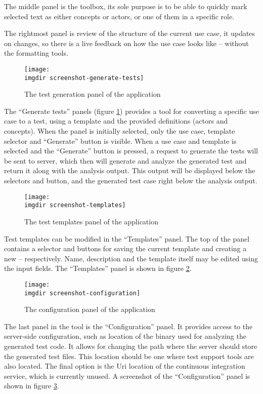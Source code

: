 \noindent The middle panel is the toolbox, its sole purpose is to be able to quickly mark selected text as either concepts or actors, or one of them in a specific role.\medskip

\noindent The rightmost panel is review of the structure of the current use case, it updates on changes, so there is a live feedback on how the use case looks like -- without the formatting tools.\medskip

\begin{figure}[!htbp]
  \centering
  \texttt{[image: \\imgdir screenshot-generate-tests]}
  \caption{The test generation panel of the application}
\label{fig:screenshot-screenshot-generate-tests}
\end{figure}

\noindent The ``Generate tests'' panels (figure \ref{fig:screenshot-screenshot-generate-tests}) provides a tool for converting a specific use case to a test, using a template and the provided definitions (actors and concepts). When the panel is initially selected, only the use case, template selector and ``Generate'' button is visible. When a use case and template is selected and the ``Generate''  button is pressed, a request to generate the tests will be sent to server, which then will generate and analyze the generated test and return it along with the analysis output. This output will be displayed below the selectors and button, and the generated test case right below the analysis output.\medskip

\begin{figure}[!htbp]
  \centering
  \texttt{[image: \\imgdir screenshot-templates]}
  \caption{The test templates panel of the application}
\label{fig:screenshot-templates}
\end{figure}

\noindent Test templates can be modified in the ``Templates'' panel. The top of the panel contains a selector and buttons for saving the current template and creating a new -- respectively. Name, description and the template itself may be edited using the input fields. The ``Templates'' panel is shown in figure \ref{fig:screenshot-templates}.\medskip

\begin{figure}[!htbp]
  \centering
  \texttt{[image: \\imgdir screenshot-configuration]}
  \caption{The configuration panel of the application}
\label{fig:screenshot-configuration}
\end{figure}

\noindent The last panel in the tool is the ``Configuration'' panel. It provides access to the server-side configuration, such as location of the binary used for analyzing the generated test code. It allows for changing the path where the server should store the generated test files. This location should be one where test support tools are also located. The final option is the Uri location of the continuous integration service, which is currently unused. A screenshot of the ``Configuration'' panel is shown in figure \ref{fig:screenshot-configuration}.
